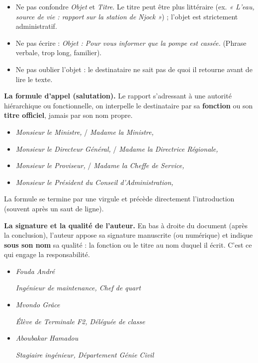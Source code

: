 \documentclass[11pt]{article}
\newcommand{\cle}[1]{{\popxbold\color{popdark}#1}}
\begin{document}
\begin{attention}
\begin{itemize}
\item Ne pas confondre \emph{Objet} et \emph{Titre}. Le titre peut être plus littéraire (ex. \emph{« L'eau, source de vie : rapport sur la station de Njock »}) ; l'objet est strictement administratif.
\item Ne pas écrire : \emph{Objet : Pour vous informer que la pompe est cassée.} (Phrase verbale, trop long, familier).
\item Ne pas oublier l'objet : le destinataire ne sait pas de quoi il retourne avant de lire le texte.
\end{itemize}
\end{attention}

\textbf{La formule d'appel (salutation).} Le rapport s'adressant à une autorité hiérarchique ou fonctionnelle, on interpelle le destinataire par sa \textbf{fonction} ou son \textbf{titre officiel}, jamais par son nom propre.
\begin{itemize}
\item \emph{Monsieur le Ministre,} / \emph{Madame la Ministre,}
\item \emph{Monsieur le Directeur Général,} / \emph{Madame la Directrice Régionale,}
\item \emph{Monsieur le Proviseur,} / \emph{Madame la Cheffe de Service,}
\item \emph{Monsieur le Président du Conseil d'Administration,}
\end{itemize}
La formule se termine par une virgule et précède directement l'introduction (souvent après un saut de ligne).

\textbf{La signature et la qualité de l'auteur.} En bas à droite du document (après la conclusion), l'auteur appose sa signature manuscrite (ou numérique) et indique \textbf{sous son nom} sa \cle{qualité} : la fonction ou le titre au nom duquel il écrit. C'est ce qui engage la responsabilité.
\begin{itemize}
\item \emph{Fouda André}\par \emph{Ingénieur de maintenance, Chef de quart}
\item \emph{Mvondo Grâce}\par \emph{Élève de Terminale F2, Déléguée de classe}
\item \emph{Aboubakar Hamadou}\par \emph{Stagiaire ingénieur, Département Génie Civil}
\end{itemize}
\end{document}
